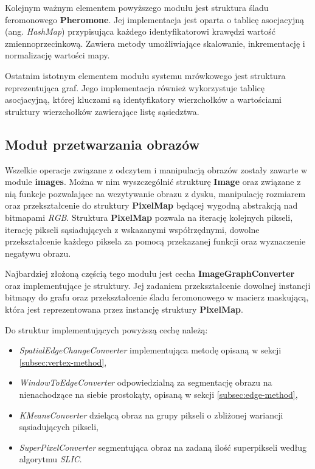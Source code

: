 {{{            Kolejnym ważnym elementem powyższego modułu jest struktura śladu feromonowego \textbf{Pheromone}. Jej
            implementacja jest oparta o tablicę asocjacyjną (ang. \textit{HashMap}) przypisująca każdego
            identyfikatorowi krawędzi wartość zmiennoprzecinkową. Zawiera metody umożliwiające skalowanie,
            inkrementację i normalizację wartości mapy.

            Ostatnim istotnym elementem modułu systemu mrówkowego jest struktura reprezentująca graf. Jego implementacja
            również wykorzystuje tablicę asocjacyjną, której kluczami są identyfikatory wierzchołków a wartościami
            struktury wierzchołków zawierające listę sąsiedztwa.
        }

        \subsection{Moduł przetwarzania obrazów}
        {
            Wszelkie operacje związane z odczytem i manipulacją obrazów zostały zawarte w module \textbf{images}. Można
            w nim wyszczególnić strukturę \textbf{Image} oraz związane z nią funkcje pozwalające na wczytywanie obrazu z
            dysku, manipulację rozmiarem oraz przekształcenie do struktury \textbf{PixelMap} będącej wygodną abstrakcją
            nad bitmapami \textit{RGB}. Struktura \textbf{PixelMap} pozwala na iterację kolejnych pikseli, iterację
            pikseli sąsiadujących z wskazanymi współrzędnymi, dowolne przekształcenie każdego piksela za pomocą
            przekazanej funkcji oraz wyznaczenie negatywu obrazu.

            Najbardziej złożoną częścią tego modułu jest cecha \textbf{ImageGraphConverter} oraz implementujące je
            struktury. Jej zadaniem przekształcenie dowolnej instancji bitmapy do grafu oraz przekształcenie śladu
            feromonowego w macierz maskującą, która jest reprezentowana przez instancję struktury \textbf{PixelMap}.

            Do struktur implementujących powyższą cechę należą:

            \begin{itemize}
                \item \textit{SpatialEdgeChangeConverter} implementująca metodę opisaną w sekcji
                \ref{subsec:vertex-method},
                \item \textit{WindowToEdgeConverter} odpowiedzialną za segmentację obrazu na nienachodzące na siebie
                prostokąty, opisaną w sekcji \ref{subsec:edge-method},
                \item \textit{KMeansConverter} dzielącą obraz na grupy pikseli o zbliżonej wariancji sąsiadujących pikseli,
                \item \textit{SuperPixelConverter} segmentująca obraz na zadaną ilość superpikseli według algorytmu
                \textit{SLIC}.
            \end{itemize}
        }

}}
